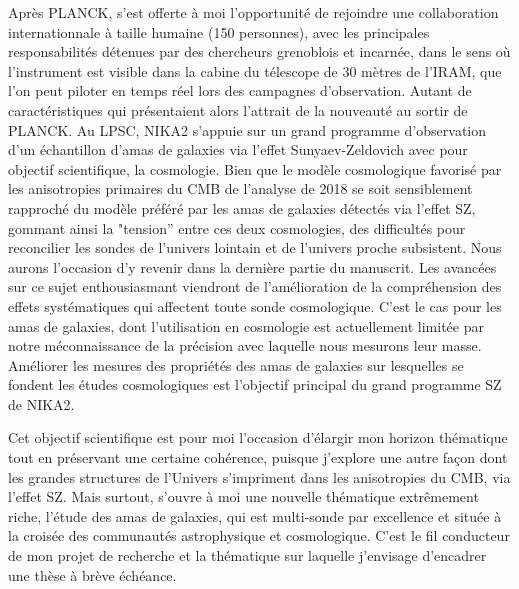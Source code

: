 \documentclass[a4paper, 12pt]{report}
\begin{document}
Après PLANCK, s'est offerte à moi l'opportunité de rejoindre une
collaboration internationnale à taille humaine (150 personnes), avec
les principales responsabilités détenues par des chercheurs grenoblois
et incarnée, dans le sens où l'instrument est visible dans la cabine
du télescope de 30 mètres de l'IRAM, que l'on peut piloter en temps
réel lors des campagnes d'observation. Autant de caractéristiques qui
présentaient alors l'attrait de la nouveauté au sortir de PLANCK. Au
LPSC, NIKA2 s'appuie sur un grand programme d'observation d'un
échantillon d'amas de galaxies via l'effet Sunyaev-Zeldovich avec pour
objectif scientifique, la cosmologie. Bien que le modèle cosmologique
favorisé par les anisotropies primaires du CMB de l'analyse de 2018 se
soit sensiblement rapproché du modèle préféré par les amas de galaxies
détectés via l'effet SZ, gommant ainsi la "tension'' entre ces deux
cosmologies, des difficultés pour reconcilier les sondes de l'univers
lointain et de l'univers proche subsistent. Nous aurons l'occasion d'y
revenir dans la dernière partie du manuscrit. Les avancées sur ce sujet
enthousiasmant viendront de l'amélioration de la compréhension des
effets systématiques qui affectent toute sonde cosmologique. C'est le
cas pour les amas de galaxies, dont l'utilisation en cosmologie est
actuellement limitée par notre méconnaissance de la précision avec
laquelle nous mesurons leur masse. Améliorer les mesures des
propriétés des amas de galaxies sur lesquelles se fondent les études
cosmologiques est l'objectif principal du grand programme SZ de NIKA2. 

Cet objectif scientifique est pour moi l'occasion d'élargir mon
horizon thématique tout en préservant une certaine cohérence, puisque
j'explore une autre façon dont les grandes structures de l'Univers
s'impriment dans les anisotropies du CMB, via l'effet SZ. Mais
surtout, s'ouvre à moi une nouvelle thématique extrêmement riche,
l'étude des amas de galaxies, qui est multi-sonde par excellence et
située à la croisée des communautés astrophysique et
cosmologique. C'est le fil conducteur de mon projet de recherche et la
thématique sur laquelle j'envisage d'encadrer une thèse à brève
échéance.
\end{document}
